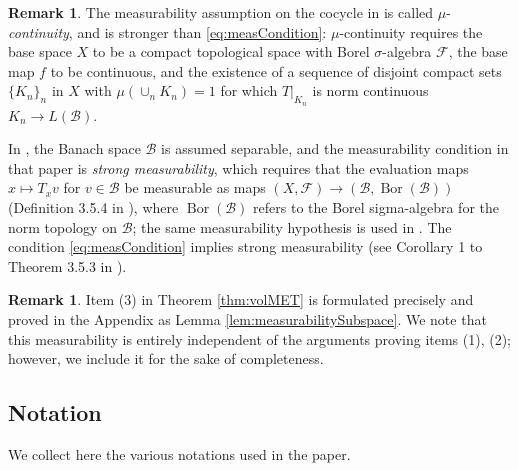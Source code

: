 \documentclass[11pt]{amsart}
\theoremstyle{theorem}
\theoremstyle{definition}
\newtheorem{rmk}[thm]{Remark}
\numberwithin{equation}{section}
\newcommand{\Fc}{\mathcal{F}}
\renewcommand{\l}{\lambda}
\newcommand{\Bc}{\mathcal{B}}
\begin{document}
\begin{rmk}
The measurability assumption on the cocycle in \cite{M, T} is called $\mu$-\emph{continuity}, and is stronger than \eqref{eq:measCondition}: $\mu$-continuity requires the base space $X$ to be a compact topological space with Borel $\sigma$-algebra $\Fc$, the base map $f$ to be continuous, and the existence of a sequence of disjoint compact sets $\{K_n\}_n$ in $X$ with $\mu \left( \cup_n K_n \right) = 1$ for which $T|_{K_n}$ is norm continuous $K_n \to L(\Bc)$. 

In \cite{LL}, the Banach space $\Bc$ is assumed separable, and the measurability condition in that paper is \emph{strong measurability}, which requires that the evaluation maps $x \mapsto T_x v$ for $v \in \Bc$ be measurable as maps $(X, \Fc) \to (\Bc, \operatorname{Bor}(\Bc))$ (Definition 3.5.4 in \cite{Hille}), where $\operatorname{Bor}(\Bc)$ refers to the Borel sigma-algebra for the norm topology on $\Bc$; the same measurability hypothesis is used in \cite{gonzalez2014concise}. The condition \eqref{eq:measCondition} implies strong measurability (see Corollary 1 to Theorem 3.5.3 in \cite{Hille}).
\end{rmk}

\begin{rmk}
Item (3) in Theorem \ref{thm:volMET} is formulated precisely and proved in the Appendix as Lemma \ref{lem:measurabilitySubspace}. We note that this measurability is entirely independent of the arguments proving items (1), (2); however, we include it for the sake of completeness.
\end{rmk}



\subsection{Notation}
We collect here the various notations used in the paper. 
\end{document}
